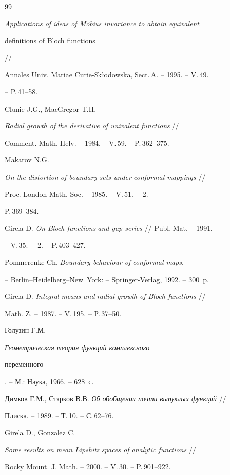 \begin{thebibliography}{99}
{\em Applications of ideas of M\"obius invariance to abtain equivalent


definitions of Bloch functions} //


Annales Univ. Mariae Curie-Sk\l odowska, Sect.\,A. -- 1995. -- V.\,49.


-- P.\,41--58.




Clunie J.G., MacGregor T.H.


{\em Radial growth of the derivative of univalent functions} //


Comment. Math. Helv. -- 1984. -- V.\,59. -- P.\,362--375.




Makarov N.G.


{\em On the distortion of boundary sets under conformal mappings} //


Proc. London Math. Soc. -- 1985. -- V.\,51. -- \No\,2. -- 


P.\,369--384.




Girela D. {\em On Bloch functions and gap series} // Publ. Mat. -- 1991.


-- V.\,35. -- \No\,2. -- P.\,403--427.




Pommerenke Ch. {\em Boundary behaviour of conformal maps}.


-- Berlin--Heidelberg--New~York: -- Springer-Verlag, 1992. -- 300~p.




Girela D. {\em Integral means and radial growth of Bloch functions} //


Math. Z. -- 1987. -- V.\,195. -- P.\,37--50.




Голузин Г.М. {\em Геометрическая теория функций комплексного


переменного}. -- М.: Наука, 1966. -- 628~с.




Димков Г.М., Старков В.В. {\em Об обобщении почти выпуклых функций} //


Плиска. -- 1989. -- Т.\,10. -- С.\,62--76.




Girela D., Gonzalez C.


{\em Some results on mean Lipshitz spaces of analytic functions} //


Rocky Mount. J. Math. -- 2000. -- V.\,30. -- P.\,901--922.



\end{thebibliography}
